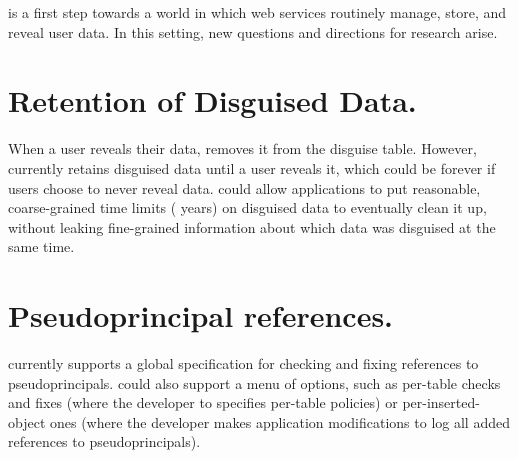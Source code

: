 \sys is a first step towards a world in which web services
routinely manage, store, and reveal \xxed user data.
%
In this setting, new questions and directions for research arise.
%

\section{Retention of Disguised Data.}
%
When a user reveals their data, \sys removes it from the disguise table.
%
However, \sys currently retains disguised data until a user reveals it, which
could be forever if users choose to never reveal data.
%
\sys could allow applications to put reasonable,
coarse-grained time limits ( years) on disguised data to eventually clean
it up, without leaking fine-grained information about which data was disguised
at the same time.


\section{Pseudoprincipal references.}
%
\sys currently supports a global specification for checking and fixing references to
pseudoprincipals.
%
\sys could also support a menu of options, such
as per-table checks and fixes (where the developer to specifies per-table
policies) or per-inserted-object ones (where the developer makes application
modifications to log all added references to pseudoprincipals).


